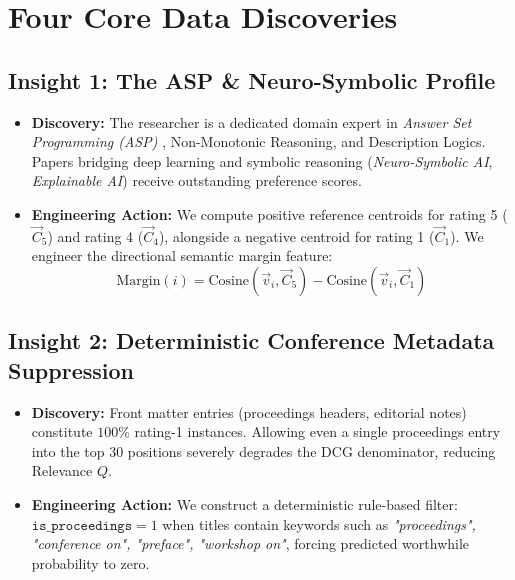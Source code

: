\section{Four Core Data Discoveries}

\subsection{Insight 1: The ASP \& Neuro-Symbolic Profile}
\begin{itemize}
  \item \textbf{Discovery:} The researcher is a dedicated domain expert in \textit{Answer Set Programming (ASP)} \cite{gebser2011potassco}, Non-Monotonic Reasoning, and Description Logics. Papers bridging deep learning and symbolic reasoning (\textit{Neuro-Symbolic AI}, \textit{Explainable AI}) receive outstanding preference scores.
  \item \textbf{Engineering Action:} We compute positive reference centroids for rating 5 ($\vec{C}_5$) and rating 4 ($\vec{C}_4$), alongside a negative centroid for rating 1 ($\vec{C}_1$). We engineer the directional semantic margin feature:
  \begin{equation}
    \text{Margin}(i) = \text{Cosine}(\vec{v}_i, \vec{C}_5) - \text{Cosine}(\vec{v}_i, \vec{C}_1)
  \end{equation}
\end{itemize}

\subsection{Insight 2: Deterministic Conference Metadata Suppression}
\begin{itemize}
  \item \textbf{Discovery:} Front matter entries (proceedings headers, editorial notes) constitute $100\%$ rating-1 instances. Allowing even a single proceedings entry into the top 30 positions severely degrades the DCG denominator, reducing Relevance $Q$.
  \item \textbf{Engineering Action:} We construct a deterministic rule-based filter: $\texttt{is\_proceedings} = 1$ when titles contain keywords such as \textit{"proceedings", "conference on", "preface", "workshop on"}, forcing predicted worthwhile probability to zero.
\end{itemize}


